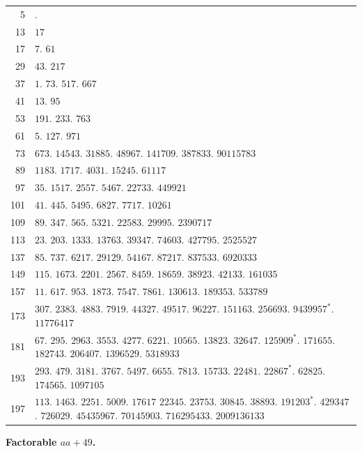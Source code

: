 \begin{longtable}{@{}r|p{\dimexpr\linewidth-38pt\relax}@{}}
5 & .\\
13 & $17$\\
17 & $7$. $61$\\
29 & $43$. $217$\\
37 & $1$. $73$. $517$. $667$\\
41 & $13$. $95$\\
53 & $191$. $233$. $763$\\
61 & $5$. $127$. $971$\\
73 & $673$. $14543$. $31885$. $48967$. $141709$. $387833$. $90115783$\\
89 & $1183$. $1717$. $4031$. $15245$. $61117$\\
97 & $35$. $1517$. $2557$. $5467$. $22733$. $449921$\\
101 & $41$. $445$. $5495$. $6827$. $7717$. $10261$\\
109 & $89$. $347$. $565$. $5321$. $22583$. $29995$. $2390717$\\
113 & $23$. $203$. $1333$. $13763$. $39347$. $74603$. $427795$. $2525527$\\
137 & $85$. $737$. $6217$. $29129$. $54167$. $87217$. $837533$. $6920333$\\
149 & $115$. $1673$. $2201$. $2567$. $8459$. $18659$. $38923$. $42133$. $161035$\\
157 & $11$. $617$. $953$. $1873$. $7547$. $7861$. $130613$. $189353$. $533789$\\
173 & $307$. $2383$. $4883$. $7919$. $44327$. $49517$. $96227$. $151163$. $256693$. $9439957^{*}$. $11776417$\\
181 & $67$. $295$. $2963$. $3553$. $4277$. $6221$. $10565$. $13823$. $32647$. $125909^{*}$. $171655$. $182743$. $206407$. $1396529$. $5318933$\\
193 & $293$. $479$. $3181$. $3767$. $5497$. $6655$. $7813$. $15733$. $22481$. $22867^{*}$. $62825$. $174565$. $1097105$\\
197 & $113$. $1463$. $2251$. $5009$. $17617$ $22345$. $23753$. $30845$. $38893$. $191203^{*}$. $429347$. $726029$. $45435967$. $70145903$. $716295433$. $2009136133$\\
\end{longtable}\endgroup
\par{}
\begin{center}\textbf{Factorable $aa+49$.}\end{center}
\begingroup\small\setlength{\tabcolsep}{5pt}
